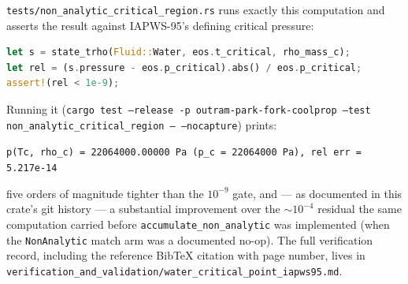 \documentclass[11pt]{article}
\begin{document}
\texttt{tests/non\_analytic\_critical\_region.rs} runs exactly this
computation and asserts the result against IAPWS-95's defining critical
pressure:
\begin{lstlisting}[language=Rust]
let s = state_trho(Fluid::Water, eos.t_critical, rho_mass_c);
let rel = (s.pressure - eos.p_critical).abs() / eos.p_critical;
assert!(rel < 1e-9);
\end{lstlisting}
Running it (\texttt{cargo test --release -p outram-park-fork-coolprop
--test non\_analytic\_critical\_region -- --nocapture}) prints:
\begin{center}
\texttt{p(Tc, rho\_c) = 22064000.00000 Pa (p\_c = 22064000 Pa), rel err = 5.217e-14}
\end{center}
five orders of magnitude tighter than the $10^{-9}$ gate, and — as
documented in this crate's git history — a substantial improvement over the
$\sim 10^{-4}$ residual the same computation carried before
\texttt{accumulate\_non\_analytic} was implemented (when the
\texttt{NonAnalytic} match arm was a documented no-op). The full
verification record, including the reference BibTeX citation with page
number, lives in
\texttt{verification\_and\_validation/water\_critical\_point\_iapws95.md}.
\end{document}
